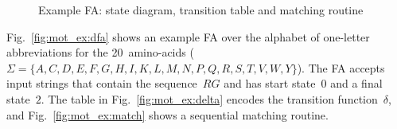 \documentclass[10pt, conference, compsocconf]{IEEEtran}
\newcommand\STR{\textit{Str}}
\newcommand\state[1][{}]{\ensuremath{{#1}}}
\newcommand\TF{\ensuremath{\delta}}
\begin{document}
\begin{figure}
{{\begin{minipage}{.33\textwidth}
        \end{minipage}
    }
\iffalse
    \begin{minipage}{.33\textwidth}
\raggedright
    \RestyleAlgo{boxed}
    \setlength{\algomargin}{1.0mm}
    \begin{algorithm}[H]
        \SetKwData{STATE}{state}
        \SetKw{RETURN}{return}
        \STATE$\leftarrow0$\\
\For{$i\leftarrow0$ \KwTo $\lvert\STR\rvert-1$}{
            \STATE$\leftarrow\TF(\STATE,\STR[i])$
        }
\end{algorithm}
    \end{minipage}
\fi
}
\caption{Example FA: state diagram, transition table and matching routine
}\label{fig:exDFA}
\end{figure}

Fig.~\ref{fig:mot_ex:dfa} shows an example FA over the
alphabet of one-letter abbreviations for the 20~amino-acids
($\Sigma=\{A,C,D,E,\allowbreak F,\allowbreak G,\allowbreak H,\allowbreak I,K,L,M,N,P,Q,R,\allowbreak S,\allowbreak T,\allowbreak V,\allowbreak W,Y\}$).
The FA accepts input strings that contain the sequence~$RG$ and has
start state~$\state[0]$ and a final state~$\state[2]$. The table in
Fig.~\ref{fig:mot_ex:delta} encodes the transition function~$\delta$,
and Fig.~\ref{fig:mot_ex:match} shows a sequential matching routine.
\end{document}
